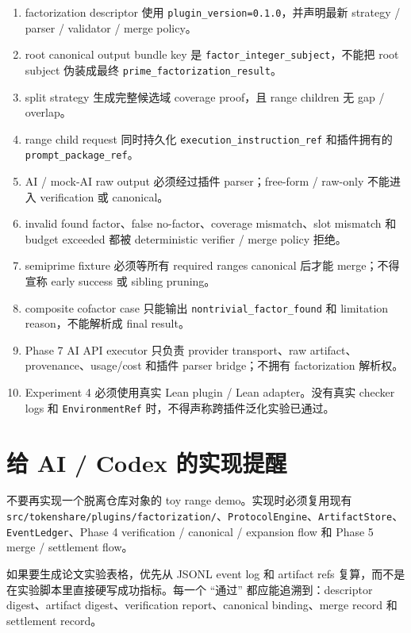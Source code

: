 \documentclass[11pt]{ctexart}
\begin{document}
\begin{enumerate}[leftmargin=2em]
  \item factorization descriptor 使用 \texttt{plugin\_version=0.1.0}，并声明最新 strategy / parser / validator / merge policy。
  \item root canonical output bundle key 是 \texttt{factor\_integer\_subject}，不能把 root subject 伪装成最终 \texttt{prime\_factorization\_result}。
  \item split strategy 生成完整候选域 coverage proof，且 range children 无 gap / overlap。
  \item range child request 同时持久化 \texttt{execution\_instruction\_ref} 和插件拥有的 \texttt{prompt\_package\_ref}。
  \item AI / mock-AI raw output 必须经过插件 parser；free-form / raw-only 不能进入 verification 或 canonical。
  \item invalid found factor、false no-factor、coverage mismatch、slot mismatch 和 budget exceeded 都被 deterministic verifier / merge policy 拒绝。
  \item semiprime fixture 必须等所有 required ranges canonical 后才能 merge；不得宣称 early success 或 sibling pruning。
  \item composite cofactor case 只能输出 \texttt{nontrivial\_factor\_found} 和 limitation reason，不能解析成 final result。
  \item Phase 7 AI API executor 只负责 provider transport、raw artifact、provenance、usage/cost 和插件 parser bridge；不拥有 factorization 解析权。
  \item Experiment 4 必须使用真实 Lean plugin / Lean adapter。没有真实 checker logs 和 \texttt{EnvironmentRef} 时，不得声称跨插件泛化实验已通过。
\end{enumerate}

\section{给 AI / Codex 的实现提醒}

不要再实现一个脱离仓库对象的 toy range demo。实现时必须复用现有 \texttt{src/tokenshare/plugins/factorization/}、\texttt{ProtocolEngine}、\texttt{ArtifactStore}、\texttt{EventLedger}、Phase 4 verification / canonical / expansion flow 和 Phase 5 merge / settlement flow。

如果要生成论文实验表格，优先从 JSONL event log 和 artifact refs 复算，而不是在实验脚本里直接硬写成功指标。每一个 “通过” 都应能追溯到：descriptor digest、artifact digest、verification report、canonical binding、merge record 和 settlement record。
\end{document}
